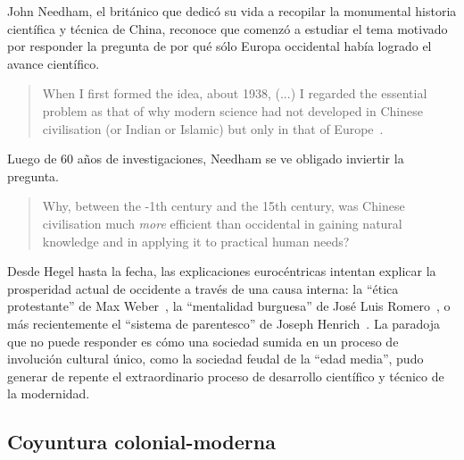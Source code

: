 \documentclass[a4paper,11pt]{book}
\theoremstyle{definition}
\begin{document}
John Needham, el brit\'anico que dedic\'o su vida a recopilar la monumental historia cient\'ifica y t\'ecnica de China, reconoce que comenz\'o a estudiar el tema motivado por responder la pregunta de por qu\'e s\'olo Europa occidental hab\'ia logrado el avance cient\'ifico.
%
\begin{quotation}
When I first formed the idea, about 1938, (...) I regarded the essential problem as that of why modern science had not developed in Chinese civilisation (or Indian or Islamic) but only in that of Europe~\cite{needham2004-generalConclusionsAndReflections}.%
\end{quotation}
Luego de 60 a\~nos de investigaciones, Needham se ve obligado inviertir la pregunta.
\begin{quotation}
Why, between the -1th century and the 15th century, was Chinese civilisation much \emph{more} efficient than occidental in gaining natural knowledge and in applying it to practical human needs?~\cite{needham2004-generalConclusionsAndReflections}
\end{quotation}


Desde Hegel hasta la fecha, las explicaciones euroc\'entricas intentan explicar la prosperidad actual de occidente a trav\'es de una causa interna: la ``\'etica protestante'' de Max Weber~\cite{weber1905-eticaProtestante}, la ``mentalidad burguesa'' de Jos\'e Luis Romero~\cite{romero1967-revolucionBurguesa}, o m\'as recientemente el ``sistema de parentesco'' de Joseph Henrich~\cite{henrich2020-weirdest}.
%
La paradoja que no puede responder es c\'omo una sociedad sumida en un proceso de involuci\'on cultural \'unico, como la sociedad feudal de la ``edad media'', pudo generar de repente el extraordinario proceso de desarrollo cient\'ifico y t\'ecnico de la modernidad.

\subsection{Coyuntura colonial-moderna}
\end{document}
